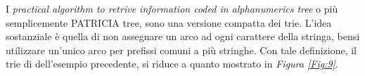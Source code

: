 \documentclass{subfiles}
\begin{document}
I \emph{practical algorithm to retrive information coded in alphanumerics tree} o più semplicemente PATRICIA tree, sono una versione compatta dei trie.
L'idea sostanziale è quella di non assegnare un arco ad ogni carattere della stringa, bensi utilizzare un'unico arco per prefissi comuni a più stringhe.
Con tale definizione, il trie di dell'esempio precedente, si riduce a quanto mostrato in \emph{Figura \ref{Fig:9}}.

\end{document}
